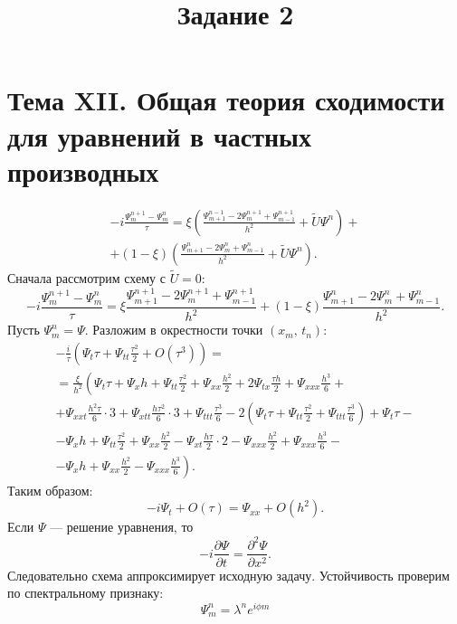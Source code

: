 \documentclass[a4paper]{article}
\title{Задание 2}
\begin{document}
	\maketitle
	\section*{Тема XII. Общая теория сходимости для уравнений в частных производных}
\begin{hiProb}[7.1]
\end{hiProb}
\begin{sol}
\begin{multline*}
-i \frac{\Psi_m^{n+1}-\Psi_m^n}{\tau}=
\xi \left( \frac{\Psi_{m+1}^{n-1}-2 \Psi_m^{n+1}+\Psi_{m-1}^{n+1}}{h^2}+ \tilde{U} \Psi^n \right) 
+\\+(1-\xi) \left( \frac{\Psi_{m+1}^{n}-2 \Psi_m^{n}+\Psi_{m-1}^{n}}{h^2}+ \tilde{U} \Psi^n \right) 
.\end{multline*} 
Сначала рассмотрим схему с $\tilde{U}=0$:
\[
-i \frac{\Psi_m^{n+1}-\Psi_m^n}{\tau}=
\xi \frac{\Psi_{m+1}^{n+1}-2 \Psi_m^{n+1}+\Psi_{m-1}^{n+1}}{h^2}+(1-\xi) \frac{\Psi_{m+1}^n -2 \Psi_m^n +\Psi_{m-1}^n}{h^2}
.\] 
Пусть $\Psi_m^n=\Psi$. Разложим в окрестности
точки $(x_m,\,t_n)$:
\begin{multline*}
	-\frac{i}{\tau} \left( \Psi_t \tau
	+\Psi_{tt} \frac{\tau^2}{2}+O\left(\tau^3\right)\right) =\\=
	\frac{\xi}{h^2} \left( 
	\Psi_t \tau +\Psi_x h + \Psi_{t t}\frac{\tau^2}{2}+\Psi_{xx} \frac{h^2}{2}+
2 \Psi_{tx} \frac{\tau h}{2}+ \Psi_{x x x}
\frac{h^3}{6} \right. + \\ + \left. \Psi_{x x t}\frac{h^2 \tau}{6}\cdot 3
+ \Psi_{x t t} \frac{h \tau^2}{6}\cdot 3+
\Psi _{t  t t} \frac{\tau^3}{6}-
2 \left( \Psi_t \tau + \Psi_{tt} \frac{\tau^2}{2}+
\Psi_{t t t} \frac{\tau^3}{6}\right)
+\Psi_t \tau \right. - \\ - \left. \Psi_x h + \Psi_{t t} \frac{\tau^2}{2}+ \Psi_{ x x} \frac{h^2}{2}- \Psi_{x t}
\frac{h \tau}{2} \cdot 2 - \Psi_{x x x} \frac{h^2}{2}
+ \Psi_{x x x} \frac{h^3}{6}\right. - \\ - \left. \Psi_x h +
\Psi_{x x} \frac{h^2}{2} -\Psi_{x x x}
\frac{h^3}{6}\right) 
.\end{multline*} 
Таким образом:
\[
	-i \Psi_t + O(\tau)= \Psi_{x x}
	+O(h^2)
.\] 
Если $\Psi$ --- решение уравнения, то 
\[
- i \frac{\partial \Psi}{\partial t}=
\frac{\partial^2 \Psi }{\partial x^2} 
.\] 
Следовательно  схема аппроксимирует исходную задачу.
Устойчивость проверим по спектральному признаку:
\[
\Psi_m^n = \lambda^n e^{i \phi m}
\]
\end{sol}
\end{document}
